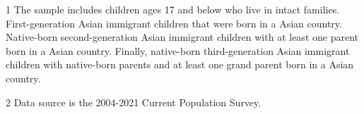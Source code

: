 \begin{table}
\centering
\caption{CPS Summary Statistics \label{tab:sumstat1}}
\centering
\begin{threeparttable}
\begin{tablenotes}
\item[1] The sample includes children ages 17 and below who live in intact families. First-generation Asian immigrant children that were born in a Asian country. Native-born second-generation Asian immigrant children with at least one parent born in a Asian country. Finally, native-born third-generation Asian immigrant children with native-born parents and at least one grand parent born in a Asian country.
\item[2] Data source is the 2004-2021 Current Population Survey.
\end{tablenotes}
\end{threeparttable}
\end{table}
